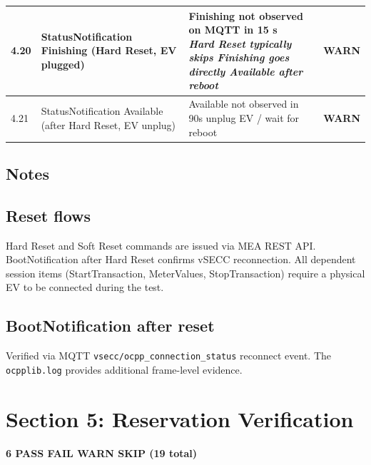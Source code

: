 \documentclass[10pt, a4paper]{article}
\begin{document}
\begin{longtable}{|L{1cm}|L{5.5cm}|M{7cm}|C{1.8cm}|}
\hline
\small 4.20 & \small StatusNotification Finishing (Hard Reset, EV plugged) & Finishing not observed on MQTT in 15 s{\newline\normalfont\footnotesize\itshape Hard Reset typically skips Finishing  goes directly Available after reboot} & \textcolor{warnorange}{\textbf{WARN}} \\
\hline
\small 4.21 & \small StatusNotification Available (after Hard Reset, EV unplug) & Available not observed in 90s  unplug EV / wait for reboot & \textcolor{warnorange}{\textbf{WARN}} \\
\hline
\end{longtable}
\normalsize
\subsection*{Notes}

\subsection*{Reset flows}
Hard Reset and Soft Reset commands are issued via MEA REST API.
BootNotification after Hard Reset confirms vSECC reconnection.
All dependent session items (StartTransaction, MeterValues, StopTransaction)
require a physical EV to be connected during the test.

\subsection*{BootNotification after reset}
Verified via MQTT \texttt{vsecc/ocpp\_connection\_status} reconnect event.
The \texttt{ocpplib.log} provides additional frame-level evidence.



\newpage
\section{Section 5: Reservation Verification}
\textbf{6 PASS  FAIL  WARN  SKIP \quad (19 total)}
\end{document}
